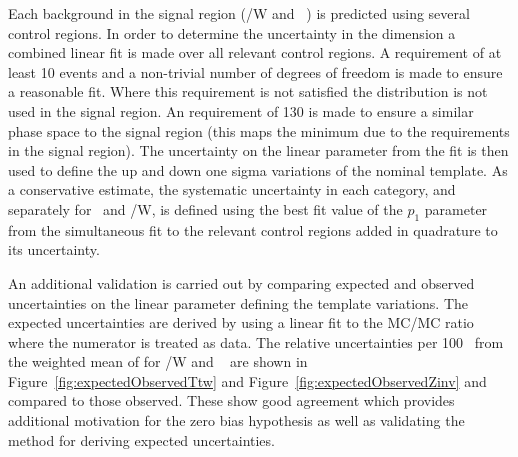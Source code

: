Each background in the signal region (\ttbar/W  and \zInv~) is predicted 
using several control regions. In order to determine the uncertainty in
the \mht dimension a combined linear fit is made over all relevant control regions. 
A requirement of at least 10 events and a non-trivial
number of degrees of freedom is made to ensure a reasonable fit. Where this
requirement is not satisfied the \mht distribution is not used in the signal region.
An \mht requirement of 130 \GeV is made to ensure a similar phase space to 
the signal region (this maps the minimum \mht due to the \alt requirements in the signal region).
The uncertainty on the linear parameter from the fit is then
used to define the up and down one sigma variations of the nominal template.
As a conservative estimate, the systematic uncertainty in each category, and separately
for \zInv~and \ttbar/W, is defined using the best fit value of the $p_1$ parameter 
from the simultaneous fit to the relevant control regions
added in quadrature to its uncertainty.


An additional validation is carried out by comparing expected and observed uncertainties
on the linear parameter defining the template variations.
The expected uncertainties are derived by using a linear fit to the MC/MC ratio where the numerator
is treated as data. The relative uncertainties per 100 \GeV~from the weighted mean of \mht
for \ttbar/W and \zInv~ are shown in Figure~\ref{fig:expectedObservedTtw} 
and Figure~\ref{fig:expectedObservedZinv} and compared to those observed.
These show good agreement which provides additional motivation for the 
zero bias hypothesis as well as validating the method for deriving expected uncertainties.


